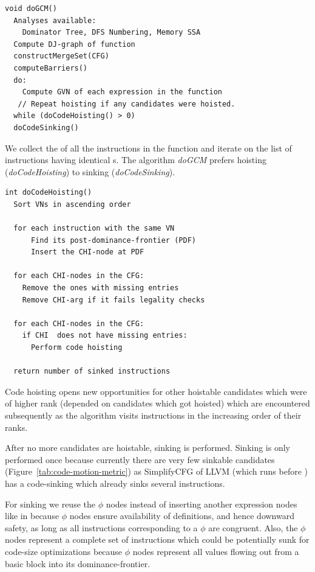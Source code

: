\documentclass[sigplan,10pt,review,anonymous]{acmart}\settopmatter{printfolios=true,printccs=false,printacmref=false}
\begin{document}
\begin{verbatim}
void doGCM()
  Analyses available:
    Dominator Tree, DFS Numbering, Memory SSA
  Compute DJ-graph of function
  constructMergeSet(CFG)
  computeBarriers()
  do:
    Compute GVN of each expression in the function
   // Repeat hoisting if any candidates were hoisted.
  while (doCodeHoisting() > 0)
  doCodeSinking()
\end{verbatim}

We collect the \GVN{} of all the instructions in the function and iterate on the
list of instructions having identical \GVN{}s. The algorithm \emph{doGCM}
prefers hoisting (\emph{doCodeHoisting}) to sinking (\emph{doCodeSinking}).


\begin{verbatim}
int doCodeHoisting()
  Sort VNs in ascending order
  
  for each instruction with the same VN
      Find its post-dominance-frontier (PDF)
      Insert the CHI-node at PDF
  
  for each CHI-nodes in the CFG:
    Remove the ones with missing entries
    Remove CHI-arg if it fails legality checks
  
  for each CHI-nodes in the CFG:
    if CHI  does not have missing entries:
      Perform code hoisting

  return number of sinked instructions
\end{verbatim}

Code hoisting opens new opportunities for other hoistable candidates which were
of higher rank (depended on candidates which got hoisted) which are encountered
subsequently as the algorithm visits instructions in the increasing order of
their ranks.

After no more candidates are hoistable, sinking is performed. Sinking is only
performed once because currently there are very few sinkable candidates
(Figure~\ref{tab:code-motion-metric}) as SimplifyCFG of LLVM (which runs before
\GCM{}) has a code-sinking which already sinks several instructions.

For sinking we reuse the $\phi$ nodes instead of inserting another expression nodes
like in \cite{ssapre} because $\phi$ nodes ensure availability of definitions, and
hence downward safety, as long as all instructions corresponding to a $\phi$ are
congruent. Also, the $\phi$ nodes represent a complete set of instructions which
could be potentially sunk for code-size optimizations because $\phi$ nodes
represent all values flowing out from a basic block into its dominance-frontier.
\end{document}
